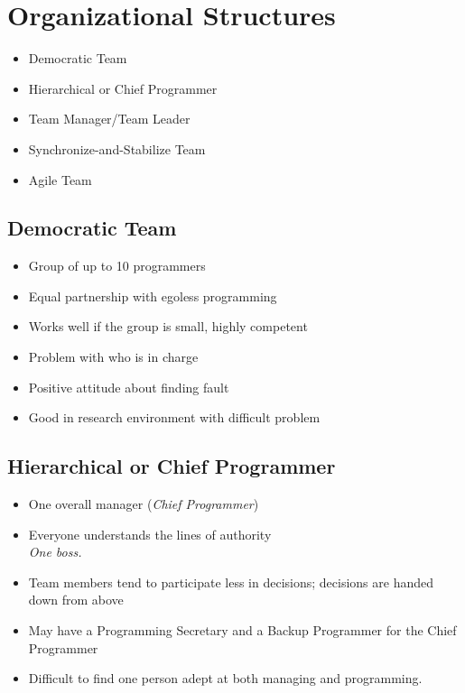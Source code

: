 \documentclass{report}
\begin{document}
		\section{Organizational Structures}
			\begin{itemize}
				\item Democratic Team
				\item Hierarchical or Chief Programmer
				\item Team Manager/Team Leader
				\item Synchronize-and-Stabilize Team
				\item Agile Team
			\end{itemize}
			\subsection{Democratic Team}
				\begin{itemize}
					\item Group of up to 10 programmers
					\item Equal partnership with egoless programming
					\item Works well if the group is small, highly competent
					\item Problem with who is in charge
					\item Positive attitude about finding fault
					\item Good in research environment with difficult problem
				\end{itemize}
			\subsection{Hierarchical or Chief Programmer}
				\begin{itemize}
					\item One overall manager (\textit{Chief Programmer})
					\item Everyone understands the lines of authority\\
						\textit{One boss.}
					\item Team members tend to participate less in decisions; decisions are handed down from above
					\item May have a Programming Secretary and a Backup Programmer for the Chief Programmer
					\item Difficult to find one person adept at both managing and programming.
				\end{itemize}
\end{document}
